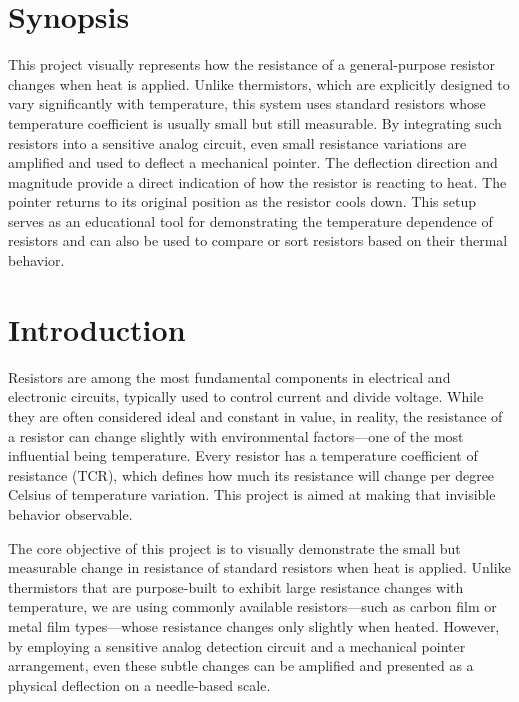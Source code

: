 \documentclass[12pt]{article}
\begin{document}
\section{Synopsis}
\label{chap:introduction}

This project visually represents how the resistance of a general-purpose resistor changes when heat is applied. Unlike thermistors, which are explicitly designed to vary significantly with temperature, this system uses standard resistors whose temperature coefficient is usually small but still measurable. By integrating such resistors into a sensitive analog circuit, even small resistance variations are amplified and used to deflect a mechanical pointer. The deflection direction and magnitude provide a direct indication of how the resistor is reacting to heat. The pointer returns to its original position as the resistor cools down. This setup serves as an educational tool for demonstrating the temperature dependence of resistors and can also be used to compare or sort resistors based on their thermal behavior.



\section{Introduction}
\label{sec:data}

Resistors are among the most fundamental components in electrical and electronic circuits, typically used to control current and divide voltage. While they are often considered ideal and constant in value, in reality, the resistance of a resistor can change slightly with environmental factors—one of the most influential being temperature. Every resistor has a temperature coefficient of resistance (TCR), which defines how much its resistance will change per degree Celsius of temperature variation. This project is aimed at making that invisible behavior observable.

The core objective of this project is to visually demonstrate the small but measurable change in resistance of standard resistors when heat is applied. Unlike thermistors that are purpose-built to exhibit large resistance changes with temperature, we are using commonly available resistors—such as carbon film or metal film types—whose resistance changes only slightly when heated. However, by employing a sensitive analog detection circuit and a mechanical pointer arrangement, even these subtle changes can be amplified and presented as a physical deflection on a needle-based scale.
\end{document}
